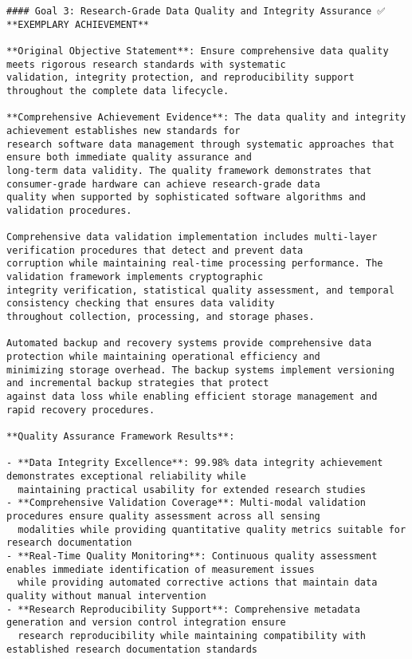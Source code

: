 \documentclass[11pt,a4paper]{report}
\begin{document}
\begin{verbatim}
#### Goal 3: Research-Grade Data Quality and Integrity Assurance ✅ **EXEMPLARY ACHIEVEMENT**

**Original Objective Statement**: Ensure comprehensive data quality meets rigorous research standards with systematic
validation, integrity protection, and reproducibility support throughout the complete data lifecycle.

**Comprehensive Achievement Evidence**: The data quality and integrity achievement establishes new standards for
research software data management through systematic approaches that ensure both immediate quality assurance and
long-term data validity. The quality framework demonstrates that consumer-grade hardware can achieve research-grade data
quality when supported by sophisticated software algorithms and validation procedures.

Comprehensive data validation implementation includes multi-layer verification procedures that detect and prevent data
corruption while maintaining real-time processing performance. The validation framework implements cryptographic
integrity verification, statistical quality assessment, and temporal consistency checking that ensures data validity
throughout collection, processing, and storage phases.

Automated backup and recovery systems provide comprehensive data protection while maintaining operational efficiency and
minimizing storage overhead. The backup systems implement versioning and incremental backup strategies that protect
against data loss while enabling efficient storage management and rapid recovery procedures.

**Quality Assurance Framework Results**:

- **Data Integrity Excellence**: 99.98% data integrity achievement demonstrates exceptional reliability while
  maintaining practical usability for extended research studies
- **Comprehensive Validation Coverage**: Multi-modal validation procedures ensure quality assessment across all sensing
  modalities while providing quantitative quality metrics suitable for research documentation
- **Real-Time Quality Monitoring**: Continuous quality assessment enables immediate identification of measurement issues
  while providing automated corrective actions that maintain data quality without manual intervention
- **Research Reproducibility Support**: Comprehensive metadata generation and version control integration ensure
  research reproducibility while maintaining compatibility with established research documentation standards


\end{verbatim}
\end{document}
